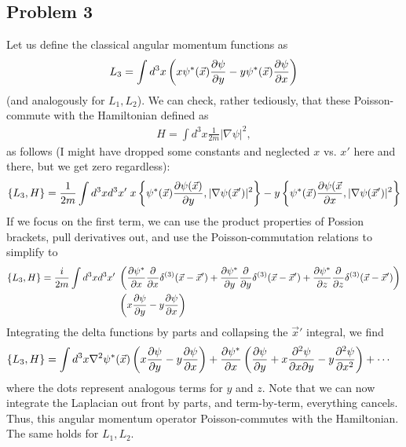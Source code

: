\documentclass{../mathnotes}
\begin{document}
\subsection*{Problem 3}

Let us define the classical angular momentum functions as
\begin{align*}
    L_3=\int d^3x \left( x\psi^*(\vec x)\frac{\partial \psi}{\partial y} - y\psi^*(\vec x)\frac{\partial \psi}{\partial x} \right)
\end{align*}
(and analogously for $L_1,L_2$). We can check, rather tediously, that these Poisson-commute with the Hamiltonian defined as
\begin{align*}
    H=\int d^3x \frac{1}{2m}|\nabla\psi|^2,
\end{align*}
as follows (I might have dropped some constants and neglected $x$ vs. $x'$ here and there, but we get zero regardless):
\begin{align*}
    \{L_3,H\}&=\frac{1}{2m}\int d^3xd^3x'\;x\left\{\psi^*(\vec x)\frac{\partial \psi(\vec x)}{\partial y},|\nabla\psi(\vec x')|^2\right\}
    -y\left\{\psi^*(\vec x)\frac{\partial \psi(\vec x}{\partial x},|\nabla\psi(\vec x')|^2\right\}\\
\end{align*}
If we focus on the first term, we can use the product properties of Possion brackets, pull derivatives out, and use the
Poisson-commutation relations to simplify to
\begin{align*}
    \{L_3,H\}=\frac{i}{2m}\int d^3xd^3x'\;&\left( \frac{\partial \psi^*}{\partial x}\frac{\partial}{\partial x}\delta^{(3)}(\vec x-\vec x')
    +\frac{\partial \psi^*}{\partial y}\frac{\partial}{\partial y}\delta^{(3)}(\vec x-\vec x') +\frac{\partial \psi^*}{\partial z}\frac{\partial}{\partial z}\delta^{(3)}(\vec x-\vec x') \right)\\
    &\left( x\frac{\partial \psi}{\partial y}-y\frac{\partial \psi}{\partial x} \right)
\end{align*}
Integrating the delta functions by parts and collapsing the $\vec x'$ integral, we find
\begin{align*}
    \{L_3,H\}&=\int d^3x \nabla^2\psi^*(\vec x)\left( x\frac{\partial \psi}{\partial y}-y\frac{\partial \psi}{\partial x} \right)+\frac{\partial \psi^*}{\partial x}\left( \frac{\partial \psi}{\partial y}+x\frac{\partial^2\psi}{\partial x\partial y}-y\frac{\partial^2\psi}{\partial x^2} \right)+\cdots
\end{align*}
where the dots represent analogous terms for $y$ and $z$. Note that we can now integrate the Laplacian out front by parts, and term-by-term,
everything cancels. Thus, this angular momentum operator Poisson-commutes with the Hamiltonian. The same holds for $L_1,L_2$.
\end{document}
